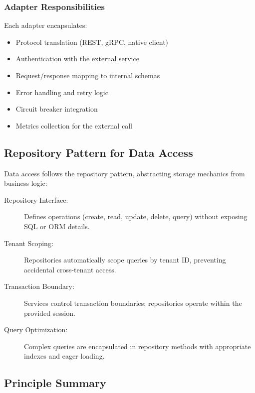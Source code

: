 \subsubsection{Adapter Responsibilities}

Each adapter encapsulates:
\begin{itemize}
    \item Protocol translation (REST, gRPC, native client)
    \item Authentication with the external service
    \item Request/response mapping to internal schemas
    \item Error handling and retry logic
    \item Circuit breaker integration
    \item Metrics collection for the external call
\end{itemize}

\subsection{Repository Pattern for Data Access}
\label{subsec:repository-pattern}

Data access follows the repository pattern, abstracting storage mechanics from business logic:

\begin{description}
    \item[Repository Interface:] Defines operations (create, read, update, delete, query) without exposing SQL or ORM details.
    
    \item[Tenant Scoping:] Repositories automatically scope queries by tenant ID, preventing accidental cross-tenant access.
    
    \item[Transaction Boundary:] Services control transaction boundaries; repositories operate within the provided session.
    
    \item[Query Optimization:] Complex queries are encapsulated in repository methods with appropriate indexes and eager loading.
\end{description}

\subsection{Principle Summary}
\label{subsec:principle-summary}

